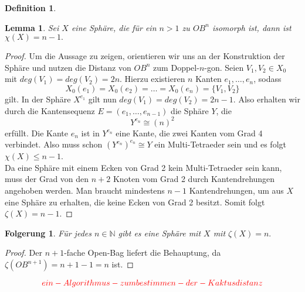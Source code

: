 \documentclass[12pt,titlepage,twoside,cleardoublepage]{article}
\theoremstyle{nummermitklammern}
\newtheorem{lemma}[temp]{Lemma}
\newtheorem{folgerung}[temp]{Folgerung}
\newtheorem{definition}[temp]{Definition}
\newtheorem{definition}[zahl]{Definition}
\newtheorem{lemma}[zahl]{Lemma}
\newtheorem{folgerung}[zahl]{Folgerung}
\numberwithin{equation}{section}
\begin{document}
\begin{definition}
\begin{comment}
mit zugehörigen Knoten $V_1,V_2 \in Y_0\subset X_0$ und $e=\{ e',e''\}\in OB^i_1\subset X_1$ eine Kante mit $X_1(e)=\{V,V'\}$ und $3 \notin \{deg_X(V),deg_X(V')\}$.
Man führt nun folgende Mender und Mutteroperationen durch:
\begin{enumerate}
\item Man wendet den Krater Cut $W:=C^C_{\{e',e''\}}(X)$ an und erhält die Kanten $e',e''\in W_1$ mit 
\begin{align*}
W_0(e') = W_0(e'')=\{V_1,V_2\}
\end{align*}
\item Durch den Split Mender entstehen die simpliziale Fläche  $Z:=S^m_{(V_1,e_1),(V,e')}(W)$, in der die Knoten $\{V_1,V\},\{V_2,V'\}$ und Kante $\{e_1,e'\}$ folgende Inzidenzen erfüllen:
\begin{align*}
Z_0(\{e_1,e'\}) = Z_0(e_2) = Z_0(e'')=\{\{V_1,V\},\{V_2,V'\}\}
\end{align*}
\item Schlussendlich gilt in $OB^{i+1}:=C^m_{e_2,e''}(Z)$, dass
\[
OB^{i+1}_0(\{e_1,e'\})=OB^{i+1}_0(\{e_2,e''\})=\{\{V_1,V\},\{V_2,V'\}\}
\]
ist.
\end{enumerate}
\end{comment}
\end{definition}


\begin{lemma}
Sei $X$ eine Sphäre, die für ein $n>1$ zu $OB^n$ isomorph ist, dann ist $\chi(X)=n-1.$
\end{lemma}
\begin{proof}
Um die Aussage zu zeigen, orientieren wir uns an der Konstruktion der Sphäre und nutzen die Distanz von $OB^n$ zum Doppel-$n$-gon. Seien $V_1,V_2\in X_0$ mit $deg(V_1)=deg(V_2)=2n$. Hierzu existieren $n$ Kanten $e_1,\ldots,e_n$, sodass 
\[
X_0(e_1)=X_0(e_2)=\ldots=X_0(e_n)=\{V_1,V_2\}
\] gilt.
In der Sphäre $X^{e_1}$ gilt nun $deg(V_1)=deg(V_2)=2n-1$. Also erhalten wir durch die Kantensequenz $E=(e_1,\ldots,e_{n-1})$ die Sphäre $Y$, die 
\[
Y^{e_n}\cong (n)^2
\] erfüllt. Die Kante $e_n$ ist in $Y^{e_n}$ eine Kante, die zwei Kanten vom Grad 4 verbindet. Also muss schon ${(Y^{e_n})}^{e_n}\cong Y$ ein Multi-Tetraeder sein und
 es folgt $\chi(X)\leq n-1$. \\
Da eine Sphäre mit einem Ecken von Grad 2 kein Multi-Tetraeder sein kann, muss der Grad von den $n+2$ Knoten vom Grad 2 durch Kantendrehungen angehoben werden. Man braucht mindestens $n-1$ Kantendrehungen, um aus $X$ eine Sphäre zu erhalten, die keine Ecken von Grad 2 besitzt. Somit folgt $\zeta(X)=n-1.$
\end{proof}
\begin{folgerung}
Für jedes $n \in \mathbb{N}$ gibt es eine Sphäre mit $X$ mit $\zeta(X)=n.$
\end{folgerung}
\begin{proof}
Der $n+1$-fache Open-Bag liefert die Behauptung, da $\zeta(OB^{n+1})=n+1-1=n$ ist.
\end{proof}
\[
\textcolor{red}{ein-Algorithmus-zum bestimmen-der-Kaktusdistanz}
\]
\end{document}

